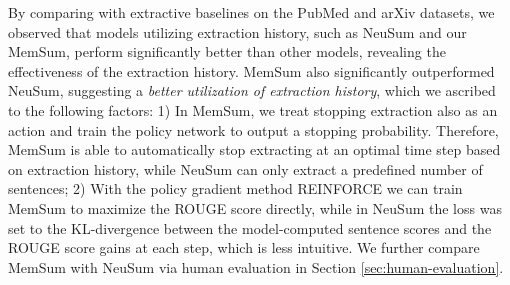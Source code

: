 \documentclass[11pt]{article}
\begin{document}
By comparing with extractive baselines on the PubMed and arXiv datasets, we observed that models utilizing extraction history, such as NeuSum and our MemSum, perform significantly better than other models, revealing the effectiveness of the extraction history. MemSum also significantly outperformed NeuSum, suggesting a \textit{better utilization of extraction history}, which we ascribed to the following factors: 1) In MemSum, we treat stopping extraction also as an action and train the policy network to output a stopping probability. Therefore, MemSum is able to automatically stop extracting at an optimal time step based on extraction history, while NeuSum can only extract a predefined number of sentences; 2) With the policy gradient method REINFORCE we can train MemSum to maximize the ROUGE score directly, while in NeuSum the loss was set to the KL-divergence between the model-computed sentence scores and the ROUGE score gains at each step, which is less intuitive. We further compare MemSum with NeuSum via human evaluation in Section \ref{sec:human-evaluation}. 

\end{document}
